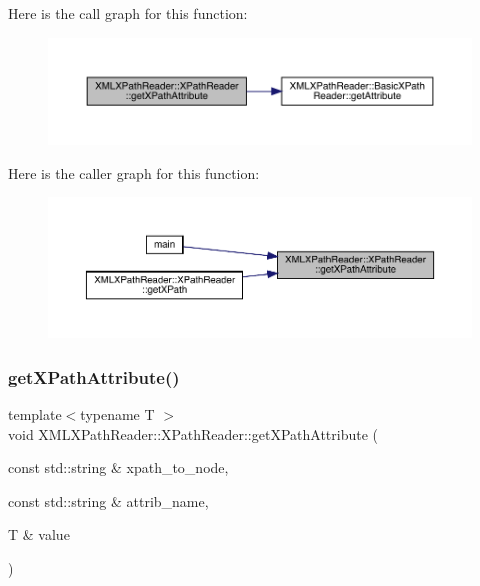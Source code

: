 Here is the call graph for this function\+:
\nopagebreak
\begin{figure}[H]
\begin{center}
\leavevmode
\includegraphics[width=350pt]{d3/d5a/classXMLXPathReader_1_1XPathReader_a0a5ca67826c2c8fdad784a3bbbba4b3c_cgraph}
\end{center}
\end{figure}
Here is the caller graph for this function\+:
\nopagebreak
\begin{figure}[H]
\begin{center}
\leavevmode
\includegraphics[width=350pt]{d3/d5a/classXMLXPathReader_1_1XPathReader_a0a5ca67826c2c8fdad784a3bbbba4b3c_icgraph}
\end{center}
\end{figure}
\mbox{\label{classXMLXPathReader_1_1XPathReader_a0a5ca67826c2c8fdad784a3bbbba4b3c}} 
\subsubsection{\texorpdfstring{getXPathAttribute()}{getXPathAttribute()}\hspace{0.1cm}{\footnotesize\ttfamily [3/3]}}
{\footnotesize\ttfamily template$<$typename T $>$ \\
void X\+M\+L\+X\+Path\+Reader\+::\+X\+Path\+Reader\+::get\+X\+Path\+Attribute (\begin{DoxyParamCaption}\item[{const std\+::string \&}]{xpath\+\_\+to\+\_\+node,  }\item[{const std\+::string \&}]{attrib\+\_\+name,  }\item[{T \&}]{value }\end{DoxyParamCaption})\hspace{0.3cm}{\ttfamily [inline]}}

